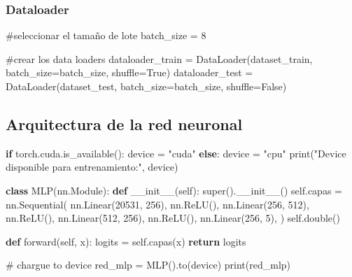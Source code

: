 \documentclass[
  10pt,
]{article}
\newenvironment{Shaded}{\begin{snugshade}}{\end{snugshade}}
\newcommand{\BuiltInTok}[1]{\textcolor[rgb]{0.00,0.23,0.31}{#1}}
\newcommand{\CommentTok}[1]{\textcolor[rgb]{0.37,0.37,0.37}{#1}}
\newcommand{\ControlFlowTok}[1]{\textcolor[rgb]{0.00,0.23,0.31}{\textbf{#1}}}
\newcommand{\DecValTok}[1]{\textcolor[rgb]{0.68,0.00,0.00}{#1}}
\newcommand{\FunctionTok}[1]{\textcolor[rgb]{0.28,0.35,0.67}{#1}}
\newcommand{\KeywordTok}[1]{\textcolor[rgb]{0.00,0.23,0.31}{\textbf{#1}}}
\newcommand{\NormalTok}[1]{\textcolor[rgb]{0.00,0.23,0.31}{#1}}
\newcommand{\OperatorTok}[1]{\textcolor[rgb]{0.37,0.37,0.37}{#1}}
\newcommand{\StringTok}[1]{\textcolor[rgb]{0.13,0.47,0.30}{#1}}
\newcommand{\VariableTok}[1]{\textcolor[rgb]{0.07,0.07,0.07}{#1}}
\begin{document}
\subsubsection{Dataloader}\label{dataloader}

\begin{Shaded}
\begin{Highlighting}[]
\CommentTok{\#seleccionar el tamaño de lote }
\NormalTok{batch\_size }\OperatorTok{=} \DecValTok{8}

\CommentTok{\#crear los data loaders }
\NormalTok{dataloader\_train }\OperatorTok{=}\NormalTok{ DataLoader(dataset\_train, batch\_size}\OperatorTok{=}\NormalTok{batch\_size, shuffle}\OperatorTok{=}\VariableTok{True}\NormalTok{)}
\NormalTok{dataloader\_test }\OperatorTok{=}\NormalTok{ DataLoader(dataset\_test, batch\_size}\OperatorTok{=}\NormalTok{batch\_size, shuffle}\OperatorTok{=}\VariableTok{False}\NormalTok{)}
\end{Highlighting}
\end{Shaded}

\subsection{Arquitectura de la red
neuronal}\label{arquitectura-de-la-red-neuronal}

\begin{Shaded}
\begin{Highlighting}[]
\ControlFlowTok{if}\NormalTok{ torch.cuda.is\_available():}
\NormalTok{    device }\OperatorTok{=} \StringTok{"cuda"}
\ControlFlowTok{else}\NormalTok{:}
\NormalTok{    device }\OperatorTok{=} \StringTok{"cpu"}
\BuiltInTok{print}\NormalTok{(}\StringTok{"Device disponible para entrenamiento:"}\NormalTok{, device)}


\KeywordTok{class}\NormalTok{ MLP(nn.Module):}
    \KeywordTok{def} \FunctionTok{\_\_init\_\_}\NormalTok{(}\VariableTok{self}\NormalTok{):}
        \BuiltInTok{super}\NormalTok{().}\FunctionTok{\_\_init\_\_}\NormalTok{()}
        \VariableTok{self}\NormalTok{.capas }\OperatorTok{=}\NormalTok{ nn.Sequential(}
\NormalTok{            nn.Linear(}\DecValTok{20531}\NormalTok{, }\DecValTok{256}\NormalTok{),}
\NormalTok{            nn.ReLU(),}
\NormalTok{            nn.Linear(}\DecValTok{256}\NormalTok{, }\DecValTok{512}\NormalTok{),}
\NormalTok{            nn.ReLU(),}
\NormalTok{            nn.Linear(}\DecValTok{512}\NormalTok{, }\DecValTok{256}\NormalTok{),}
\NormalTok{            nn.ReLU(),}
\NormalTok{            nn.Linear(}\DecValTok{256}\NormalTok{, }\DecValTok{5}\NormalTok{),}
\NormalTok{        )}
        \VariableTok{self}\NormalTok{.double()}

    \KeywordTok{def}\NormalTok{ forward(}\VariableTok{self}\NormalTok{, x):}
\NormalTok{        logits }\OperatorTok{=} \VariableTok{self}\NormalTok{.capas(x)}
        \ControlFlowTok{return}\NormalTok{ logits}


\CommentTok{\# chargue to device}
\NormalTok{red\_mlp }\OperatorTok{=}\NormalTok{ MLP().to(device)}
\BuiltInTok{print}\NormalTok{(red\_mlp)}
\end{Highlighting}
\end{Shaded}
\end{document}
